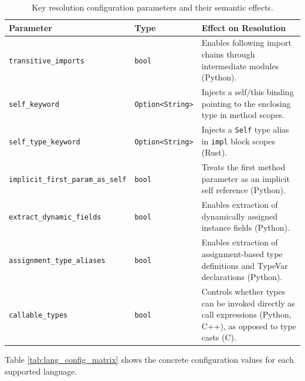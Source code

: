 \begin{table}[htpb]
  \centering
  \small
  \begin{tabularx}{\textwidth}{|l|l|Y|}
    \hline
    \textbf{Parameter} & \textbf{Type} & \textbf{Effect on Resolution} \\ \hline
    \texttt{transitive\_imports} & \texttt{bool} & Enables following
    import chains through intermediate modules (Python). \\ \hline
    \texttt{self\_keyword} & \texttt{Option<String>} & Injects a
    self/this binding pointing to the enclosing type in method scopes. \\ \hline
    \texttt{self\_type\_keyword} & \texttt{Option<String>} & Injects
    a \texttt{Self} type alias in \texttt{impl} block scopes (Rust). \\ \hline
    \texttt{implicit\_first\_param\_as\_self} & \texttt{bool} &
    Treats the first method parameter as an implicit self reference
    (Python). \\ \hline
    \texttt{extract\_dynamic\_fields} & \texttt{bool} & Enables
    extraction of dynamically assigned instance fields (Python). \\ \hline
    \texttt{assignment\_type\_aliases} & \texttt{bool} & Enables
    extraction of assignment-based type definitions and TypeVar
    declarations (Python). \\ \hline
    \texttt{callable\_types} & \texttt{bool} & Controls whether types
    can be invoked directly as call expressions (Python, C++), as
    opposed to type casts (C). \\ \hline
  \end{tabularx}
  \caption{Key resolution configuration parameters and their semantic effects.}
  \label{tab:resolution_config}
\end{table}

Table \ref{tab:lang_config_matrix} shows the concrete configuration
values for each supported language.

